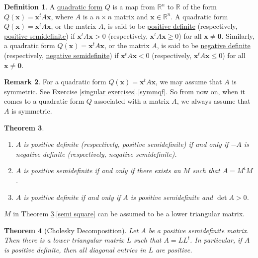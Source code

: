 \documentclass[12pt,letterpaper]{book}
\numberwithin{equation}{section}
\newtheorem{thm}{\textbf{Theorem}}[section]
\theoremstyle{definition}
\newtheorem{defi}[thm]{\textbf{Definition}}
\newtheorem{remark}[thm]{\textbf{Remark}}
\newcommand{\vx}{\bm{x}}
\newcommand{\veczero}{\bm{0}}
\begin{document}
\begin{defi} A \underline{quadratic form} $Q$ is a map from $\mathbb{R}^n$ to $\mathbb{R}$ of the form $Q(\vx)=\vx^t A \vx$, where $A$ is a $n\times n$ matrix and $\vx\in \mathbb{R}^n$. A quadratic form $Q(\vx)=\vx^t A\vx$, or the matrix $A$, is said to be \underline{positive definite} (respectively, \underline{positive semidefinite}) if $\vx^t A\vx>0$ (respectively, $\vx^t A\vx\geq 0$) for all $\vx\neq \veczero$. Similarly, a quadratic form $Q(\vx)=\vx^t A\vx$, or the matrix $A$, is said to be \underline{negative definite} (respectively, \underline{negative semidefinite}) if $\vx^t A\vx<0$ (respectively, $\vx^t A\vx\leq 0$) for all $\vx\neq \veczero$.
\end{defi}

\begin{remark}
For a quadratic form $Q(\vx)=\vx^t A \vx$, we may assume that $A$ is symmetric. See Exercise \ref{singular exercises}.\ref{symmqf}. So from now on, when it comes to a quadratic form $Q$ associated with a matrix $A$, we always assume that $A$ is symmetric.
\end{remark}

\begin{thm} \quad \label{posdef charact}
\begin{enumerate}
\item $A$ is positive definite (respectively, positive semidefinite) if and only if $-A$ is negative definite (respectively, negative semidefinite).
\item \label{semi square} $A$ is positive semidefinite if and only if there exists an $M$ such that $A=M^tM$.
\item \label{semi becomes pos} $A$ is positive definite if and only if $A$ is positive semidefinite and $\det A>0$.
\end{enumerate}
\end{thm}

$M$ in Theorem \ref{posdef charact}.\ref{semi square} can be assumed to be a lower triangular matrix.

\begin{thm}[Cholesky Decomposition]
Let $A$ be a positive semidefinite matrix. Then there is a lower triangular matrix $L$ such that $A=LL^t$. In particular, if $A$ is positive definite, then all diagonal entries in $L$ are positive.
\end{thm}
\end{document}
